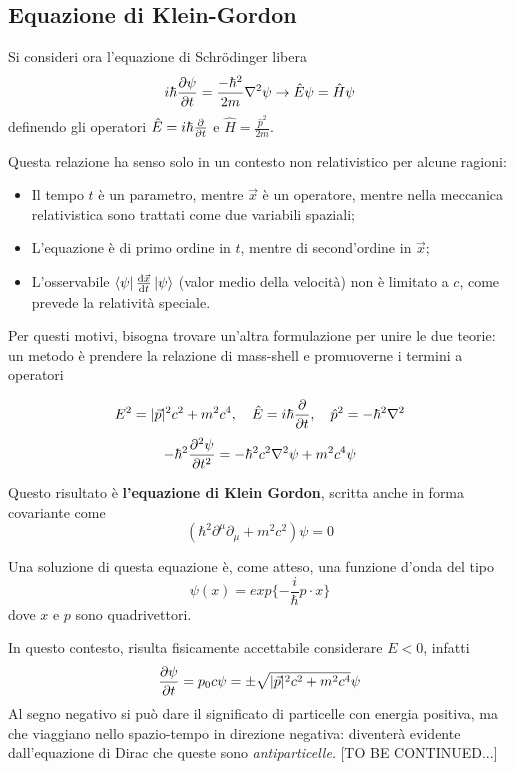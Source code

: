 \subsection{Equazione di Klein-Gordon}

Si consideri ora l'equazione di Schrödinger libera
$$ i \hbar\pdv{\psi}{t}=\frac{-\hbar^2}{2m}\laplacian\psi \rightarrow \hat{E}\psi = \hat{H}\psi$$
definendo gli operatori $ \hat{E} = i \hbar \pdv{t} $ e $ \hat{H} = \frac{\hat{p}^2}{2m} $.

Questa relazione ha senso solo in un contesto non relativistico per alcune ragioni:
\begin{itemize}
    \item Il tempo $ t $ è un parametro, mentre $ \vec{x}$ è un operatore, mentre nella meccanica
	relativistica sono trattati come due variabili spaziali;
    \item L'equazione è di primo ordine in $ t $, mentre di second'ordine in $ \vec{x} $;
    \item L'osservabile $ \bra{\psi} \dv{\vec{x}}{t}\ket{\psi} $ (valor medio della velocità) non è
	limitato a $ c $, come prevede la relatività speciale. 
\end{itemize}

Per questi motivi, bisogna trovare un'altra formulazione per unire le due teorie:
un metodo è prendere la relazione di mass-shell e promuoverne i termini a operatori

$$ E^2 = |\vec{p}|^2c^2 + m^2c^4, \quad \hat{E}=i \hbar\pdv{t},\quad \hat{p}^2 = -\hbar^2\laplacian$$
$$-\hbar^2 \pdv[2]{\psi}{t} = -\hbar^2c^2\laplacian\psi + m^2c^4\psi$$ 

Questo risultato è \textbf{l'equazione di Klein Gordon}, scritta anche in forma covariante come
$$ (\hbar^2\partial^{\mu}\partial_{\mu} + m^2c^2)\psi = 0 $$ 

Una soluzione di questa equazione è, come atteso, una funzione d'onda del tipo
$$ \psi(x) = exp\{-\frac{i}{\hbar}p\cdot x\} $$
dove $ x $ e $ p $ sono quadrivettori.

In questo contesto, risulta fisicamente accettabile considerare $ E<0 $, infatti 
$$ \pdv{\psi}{t} = p_0c\psi = \pm\sqrt{|\vec{p}|^2c^2+m^2c^4}\psi$$
Al segno negativo si può dare il significato di particelle con energia positiva,
ma che viaggiano nello spazio-tempo in direzione negativa: diventerà evidente dall'equazione di Dirac
che queste sono \textit{antiparticelle}. [TO BE CONTINUED...]

